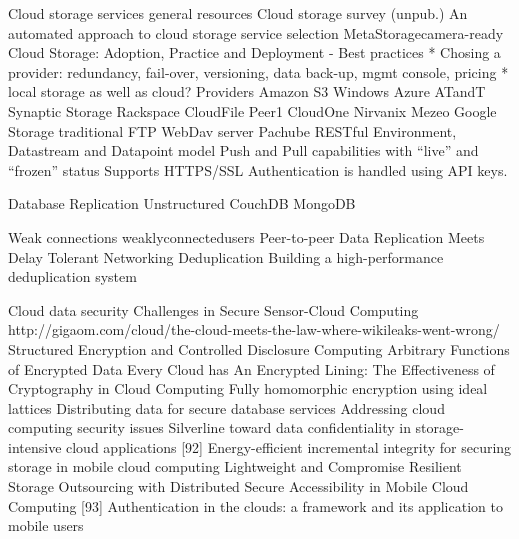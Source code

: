 	Cloud storage services
		general resources
			Cloud storage survey (unpub.)
			An automated approach to cloud storage service selection
			MetaStoragecamera-ready
			Cloud Storage: Adoption, Practice and Deployment
				- Best practices
					* Chosing a provider: redundancy, fail-over, versioning, data back-up, mgmt console, pricing
					* local storage as well as cloud?
		Providers
			Amazon S3
			Windows Azure
			ATandT Synaptic Storage
			Rackspace CloudFile
			Peer1 CloudOne
			Nirvanix
			Mezeo
			Google Storage
			traditional FTP
			WebDav server
			Pachube
				RESTful
				Environment, Datastream and Datapoint model
				Push and Pull capabilities with ``live'' and ``frozen'' status
				Supports HTTPS/SSL
				Authentication is handled using API keys.


	Database Replication
		Unstructured
			CouchDB
			MongoDB

	Weak connections
		weaklyconnectedusers
		Peer-to-peer Data Replication Meets Delay Tolerant Networking
	Deduplication
		Building a high-performance deduplication system
	
	Cloud data security
		Challenges in Secure Sensor-Cloud Computing
		http://gigaom.com/cloud/the-cloud-meets-the-law-where-wikileaks-went-wrong/
		Structured Encryption and Controlled Disclosure
		Computing Arbitrary Functions of Encrypted Data
		Every Cloud has An Encrypted Lining: The Effectiveness of Cryptography in Cloud Computing	
		Fully homomorphic encryption using ideal lattices
		Distributing data for secure database services
		Addressing cloud computing security issues
		Silverline toward data confidentiality in storage-intensive cloud applications
		[92] Energy-efficient incremental integrity for securing storage in mobile cloud computing
		Lightweight and Compromise Resilient Storage Outsourcing with Distributed Secure Accessibility in Mobile Cloud Computing
		[93] Authentication in the clouds: a framework and its application to mobile users				